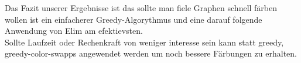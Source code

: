 \documentclass[11pt]{article}
\begin{document}
Das Fazit unserer Ergebnisse ist das sollte man fiele Graphen schnell färben wollen ist ein einfacherer Greedy-Algorythmus und eine darauf folgende Anwendung von Elim am efektievsten. \\
Sollte Laufzeit oder Rechenkraft von weniger interesse sein kann statt greedy, greedy-color-swapps angewendet werden um noch bessere Färbungen zu erhalten.



\end{document}
